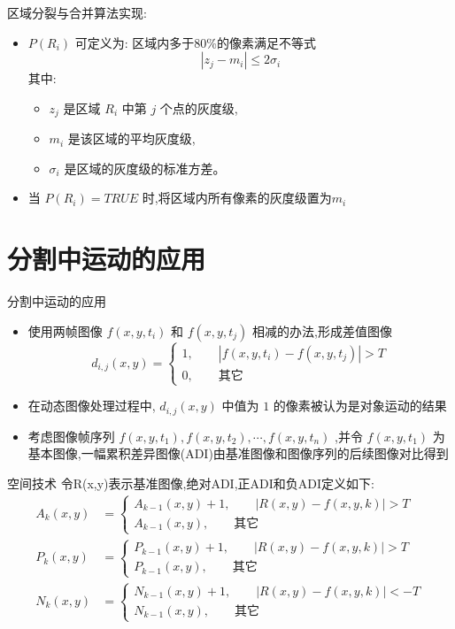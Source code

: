 \documentclass[presentation]{beamer}
\begin{document}
\begin{frame}[label={sec:org33d91e6}]{区域分裂与合并算法实现:}
\begin{itemize}
\item \(P(R_i)\) 可定义为:  区域内多于80\%的像素满足不等式
 \[|z_j-m_i|\leq 2σ_i\]
其中: 
\begin{itemize}
\item \(z_j\) 是区域 \(R_i\) 中第 \(j\) 个点的灰度级,
\item \(m_i\) 是该区域的平均灰度级,
\item \(σ_i\) 是区域的灰度级的标准方差。
\end{itemize}

\item 当 \(P(R_i)=TRUE\) 时,将区域内所有像素的灰度级置为\(m_i\)
\end{itemize}
\end{frame}

\section{分割中运动的应用}
\label{sec:org738f26b}
\begin{frame}[label={sec:org1bb459d}]{分割中运动的应用}
\begin{itemize}
\item 使用两帧图像 \(f(x,y,t_i)\) 和 \(f(x,y,t_j)\) 相减的办法,形成差值图像
\[d_{i,j}(x,y)=\begin{cases} 1, \qquad |f(x,y,t_i)-f(x,y,t_j)|>T \\   0,\qquad \text{其它} \end{cases}\]
\item 在动态图像处理过程中, \(d_{i,j}(x,y)\) 中值为 \(1\) 的像素被认为是对象运动的结果
\item 考虑图像帧序列 \(f(x,y,t_1),f(x,y,t_2),\cdots,f(x,y,t_n)\) ,并令 \(f(x,y,t_1)\) 为基本图像,一幅累积差异图像(ADI)由基准图像和图像序列的后续图像对比得到
\end{itemize}
\end{frame}

\begin{frame}[label={sec:org981ebab}]{空间技术}
令R(x,y)表示基准图像,绝对ADI,正ADI和负ADI定义如下:
\begin{align*}
A_k(x,y)&=\begin{cases} A_{k-1}(x,y)+1, \qquad |R(x,y)-f(x,y,k)|>T \\
                       A_{k-1}(x,y) , \qquad \text{其它}\end{cases}\\
P_k(x,y)&=\begin{cases} P_{k-1}(x,y)+1, \qquad |R(x,y)-f(x,y,k)|>T \\
                       P_{k-1}(x,y) , \qquad \text{其它}\end{cases}\\
N_k(x,y)&=\begin{cases} N_{k-1}(x,y)+1, \qquad |R(x,y)-f(x,y,k)|<-T \\
                       N_{k-1}(x,y) , \qquad \text{其它}\end{cases}
\end{align*}
\end{frame}
\end{document}
